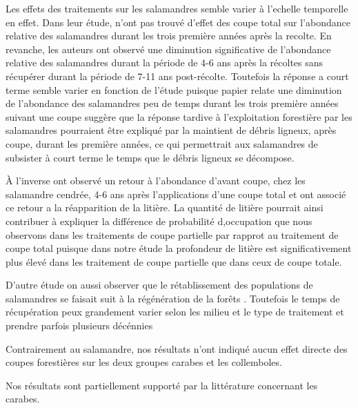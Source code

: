 Les effets des traitements sur les salamandres semble varier à l'echelle temporelle en effet.
Dans leur étude, \cite{Ochs2022Responseterrestrial} n'ont pas trouvé d'effet des coupe total sur l'abondance relative des salamandres durant les trois première années après la recolte.
En revanche, les auteurs ont observé une diminution significative de l'abondance relative des salamandres durant la période de 4-6 ans après la récoltes sans récupérer durant la période de 7-11 ans post-récolte.
Toutefois la réponse a court terme semble varier en fonction de l'étude puisque papier relate une diminution de l'abondance des salamandres peu de temps durant les trois première années suivant une coupe \citep{deMaynadier1995relationshipforest,Macneil2014Effectstimber}
\cite{Ochs2022Responseterrestrial} suggère que la réponse tardive à l'exploitation forestière par les salamandres pourraient être expliqué par la maintient de débris ligneux, après coupe, durant les première années, ce qui permettrait aux salamandres de subsister à court terme le temps que le débris ligneux se décompose.


À l'inverse \cite{Ash1997DisappearanceReturn} ont observé un retour à l'abondance d'avant coupe, chez les salamandre cendrée, 4-6 ans après l'applications d'une coupe total et ont associé ce retour a la réapparition de la litière. 
La quantité de litière pourrait ainsi contribuer à expliquer la différence de probabilité d,occupation que nous observons dans les traitements de coupe partielle par rapprot au traitement de coupe total puisque dans notre étude la profondeur de litière est significativement plus élevé dans les traitement de coupe partielle que dans ceux de coupe totale.

D'autre étude on aussi observer que le rétablissement des populations de salamandres se faisait suit à la régénération de la forêts \citep{Tilghman2012Metaanalysiseffects}. 
Toutefois le temps de récupération peux grandement varier selon les milieu et le type de traitement et prendre parfois plusieurs décénnies \citep{Homyack2013Effectsrepeatedstand,Ochs2022Responseterrestrial}




Contrairement au salamandre, nos résultats n'ont indiqué aucun effet directe des coupes forestières sur les deux groupes carabes et les collemboles.

Nos résultats sont partiellement supporté par la littérature concernant les carabes. 

